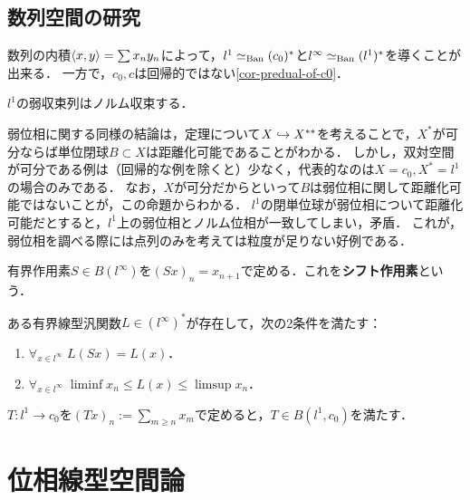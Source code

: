 \documentclass[uplatex,dvipdfmx]{jsreport}
\begin{document}
\subsection{数列空間の研究}

\begin{example}[数列空間の間のペアリング]
    数列の内積$\langle x,y\rangle=\sum x_ny_n$によって，$l^1\simeq_{\mathrm{Ban}}(c_0)^*$と$l^\infty\simeq_{\mathrm{Ban}}(l^1)^*$を導くことが出来る．
    一方で，$c_0,c$は回帰的ではない\ref{cor-predual-of-c0}．
\end{example}

\begin{proposition}\label{prop-Schur}
    $l^1$の弱収束列はノルム収束する．
\end{proposition}
\begin{remarks}
    弱位相に関する同様の結論は，定理について$X\hookrightarrow X^{**}$を考えることで，$X^*$が可分ならば単位閉球$B\subset X$は距離化可能であることがわかる．
    しかし，双対空間が可分である例は（回帰的な例を除くと）少なく，代表的なのは$X=c_0,X^*=l^1$の場合のみである．
    なお，$X$が可分だからといって$B$は弱位相に関して距離化可能ではないことが，この命題からわかる．
    $l^1$の閉単位球が弱位相について距離化可能だとすると，$l^1$上の弱位相とノルム位相が一致してしまい，矛盾．
    これが，弱位相を調べる際には点列のみを考えては粒度が足りない好例である．
\end{remarks}

\begin{definition}
    有界作用素$S\in B(l^\infty)$を$(Sx)_n=x_{n+1}$で定める．これを\textbf{シフト作用素}という．
\end{definition}

\begin{proposition}[極限作用素の存在]
    ある有界線型汎関数$L\in(l^\infty)^*$が存在して，次の2条件を満たす：
    \begin{enumerate}
        \item $\forall_{x\in l^\infty}\;L(Sx)=L(x)$．
        \item $\forall_{x\in l^\infty}\;\liminf x_n\le L(x)\le\limsup x_n$．
    \end{enumerate}
\end{proposition}

\begin{proposition}[部分和作用素]
    $T:l^1\to c_0$を$(Tx)_n:=\sum_{m\ge n}x_m$で定めると，$T\in B(l^1,c_0)$を満たす．
\end{proposition}

\section{位相線型空間論}
\end{document}
